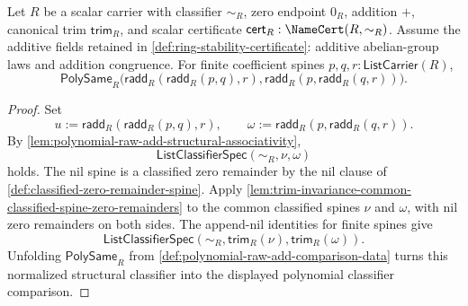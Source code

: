 \begin{theorem}
\label{thm:polynomial-raw-addition-associativity}
Let $R$ be a scalar carrier with classifier $\sim_R$, zero endpoint $0_R$, addition $+$, canonical trim $\mathsf{trim}_R$, and scalar certificate $\mathsf{cert}_R:\NameCert(R,\sim_R)$. Assume the additive fields retained in \autoref{def:ring-stability-certificate}: additive abelian-group laws and addition congruence. For finite coefficient spines $p,q,r:\mathsf{ListCarrier}(R)$,
$$
\mathsf{PolySame}_R\bigl(\mathsf{radd}_R(\mathsf{radd}_R(p,q),r),
\mathsf{radd}_R(p,\mathsf{radd}_R(q,r))\bigr).
$$
\end{theorem}
\begin{proof}
Set
$$
u:=\mathsf{radd}_R(\mathsf{radd}_R(p,q),r),
\qquad
\omega:=\mathsf{radd}_R(p,\mathsf{radd}_R(q,r)).
$$
By \autoref{lem:polynomial-raw-add-structural-associativity},
$$
\mathsf{ListClassifierSpec}(\sim_R,\nu,\omega)
$$
holds. The nil spine is a classified zero remainder by the nil clause of \autoref{def:classified-zero-remainder-spine}. Apply \autoref{lem:trim-invariance-common-classified-spine-zero-remainders} to the common classified spines $\nu$ and $\omega$, with nil zero remainders on both sides. The append-nil identities for finite spines give
$$
\mathsf{ListClassifierSpec}(\sim_R,\mathsf{trim}_R(\nu),\mathsf{trim}_R(\omega)).
$$
Unfolding $\mathsf{PolySame}_R$ from \autoref{def:polynomial-raw-add-comparison-data} turns this normalized structural classifier into the displayed polynomial classifier comparison.
\end{proof}

